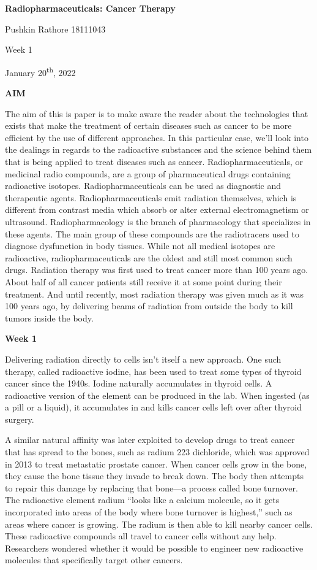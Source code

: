 \documentclass[
]{article}
\author{}
\date{}
\begin{document}
\textbf{{Radiopharmaceuticals: Cancer Therapy}}

Pushkin Rathore 18111043

Week 1

January 20\textsuperscript{th}, 2022

\textbf{AIM}

The aim of this is paper is to make aware the reader about the
technologies that exists that make the treatment of certain diseases
such as cancer to be more efficient by the use of different approaches.
In this particular case, we'll look into the dealings in regards to the
radioactive substances and the science behind them that is being applied
to treat diseases such as cancer. Radiopharmaceuticals, or medicinal
radio compounds, are a group of pharmaceutical drugs containing
radioactive isotopes. Radiopharmaceuticals can be used as diagnostic and
therapeutic agents. Radiopharmaceuticals emit radiation themselves,
which is different from contrast media which absorb or alter external
electromagnetism or ultrasound. Radiopharmacology is the branch of
pharmacology that specializes in these agents. The main group of these
compounds are the radiotracers used to diagnose dysfunction in body
tissues. While not all medical isotopes are radioactive,
radiopharmaceuticals are the oldest and still most common such drugs.
Radiation therapy was first used to treat cancer more than 100 years
ago. About half of all cancer patients still receive it at some point
during their treatment. And until recently, most radiation therapy was
given much as it was 100 years ago, by delivering beams of radiation
from outside the body to kill tumors inside the body.

\textbf{Week 1}

Delivering radiation directly to cells isn't itself a new approach. One
such therapy, called radioactive iodine, has been used to treat some
types of thyroid cancer since the 1940s. Iodine naturally accumulates in
thyroid cells. A radioactive version of the element can be produced in
the lab. When ingested (as a pill or a liquid), it accumulates in and
kills cancer cells left over after thyroid surgery.

A similar natural affinity was later exploited to develop drugs to treat
cancer that has spread to the bones, such as radium 223 dichloride,
which was approved in 2013 to treat metastatic prostate cancer. When
cancer cells grow in the bone, they cause the bone tissue they invade to
break down. The body then attempts to repair this damage by replacing
that bone---a process called bone turnover. The radioactive element
radium ``looks like a calcium molecule, so it gets incorporated into
areas of the body where bone turnover is highest,'' such as areas where
cancer is growing. The radium is then able to kill nearby cancer cells.
These radioactive compounds all travel to cancer cells without any help.
Researchers wondered whether it would be possible to engineer new
radioactive molecules that specifically target other cancers.
\end{document}

